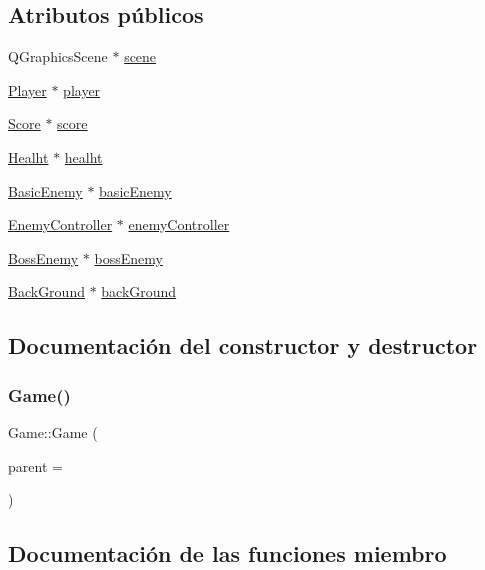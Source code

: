 \subsection*{Atributos públicos}
\begin{DoxyCompactItemize}
\item 
Q\+Graphics\+Scene $\ast$ \hyperlink{class_game_a8119e3b9a632906c6808fa294b46a92a}{scene}
\item 
\hyperlink{class_player}{Player} $\ast$ \hyperlink{class_game_abec70aa1c0269a9a7e171af4d79e08bf}{player}
\item 
\hyperlink{class_score}{Score} $\ast$ \hyperlink{class_game_ad195acc6b5ee17a5a07fea0b7b4ff5e2}{score}
\item 
\hyperlink{class_healht}{Healht} $\ast$ \hyperlink{class_game_af7860ba10bf58b4bfed1e00f5f699755}{healht}
\item 
\hyperlink{class_basic_enemy}{Basic\+Enemy} $\ast$ \hyperlink{class_game_a14c5877efccfde28a30d4d15f7dd68be}{basic\+Enemy}
\item 
\hyperlink{class_enemy_controller}{Enemy\+Controller} $\ast$ \hyperlink{class_game_a1732035088c7b0150817197895116097}{enemy\+Controller}
\item 
\hyperlink{class_boss_enemy}{Boss\+Enemy} $\ast$ \hyperlink{class_game_a24b3b9175f68e174b9cc88c4372fee68}{boss\+Enemy}
\item 
\hyperlink{class_back_ground}{Back\+Ground} $\ast$ \hyperlink{class_game_a524bd09cf01b51b835f6c574c88ed0ee}{back\+Ground}
\end{DoxyCompactItemize}


\subsection{Documentación del constructor y destructor}
\hypertarget{class_game_ae3c64a8dd73de0a99849db8ec0e9a86c}{}\label{class_game_ae3c64a8dd73de0a99849db8ec0e9a86c} 
\subsubsection{\texorpdfstring{Game()}{Game()}}
{\footnotesize\ttfamily Game\+::\+Game (\begin{DoxyParamCaption}\item[{Q\+Widget $\ast$}]{parent = {} }\end{DoxyParamCaption})}



\subsection{Documentación de las funciones miembro}
\hypertarget{class_game_af74fd203e3b31917ca9d4769fa608c48}{}\label{class_game_af74fd203e3b31917ca9d4769fa608c48} 
